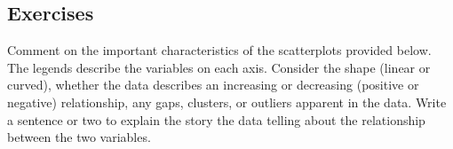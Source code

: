 \documentclass[10pt,]{book}
\theoremstyle{ptxdefinitionnotitle}
\theoremstyle{ptxdefinitiontitle}
\numberwithin{equation}{section}
\begin{document}
\typeout{************************************************}
\typeout{************************************************}
\subsection*{Exercises}\hypertarget{exercises-3}{}
\begin{divisionexercise}{1}\hypertarget{exercise-8}{}
\hypertarget{p-91}{}%
Comment on the important characteristics of the scatterplots provided below. The legends describe the variables on each axis. Consider the shape (linear or curved), whether the data describes an increasing or decreasing (positive or negative) relationship, any gaps, clusters, or outliers apparent in the data. Write a sentence or two to explain the story the data telling about the relationship between the two variables.%
\end{divisionexercise}%
\end{document}
